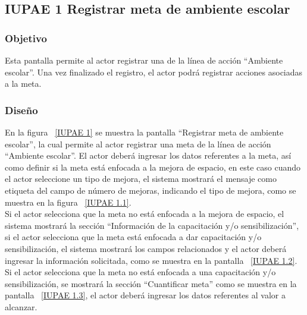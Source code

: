 \subsection{IUPAE 1 Registrar meta de ambiente escolar}
                     
\subsubsection{Objetivo}

   Esta pantalla permite al actor registrar una  de la línea de acción ``Ambiente escolar''. Una vez finalizado el registro, el actor podrá registrar acciones asociadas a la meta.

	
\subsubsection{Diseño}

  En la figura ~\ref{IUPAE 1} se muestra la pantalla ``Registrar meta de ambiente escolar'',
  la cual permite al actor registrar una meta de la línea de acción ``Ambiente escolar''. 
  El actor deberá ingresar los datos referentes a la meta, así como definir si la meta está enfocada a la mejora de espacio, en este caso 
  cuando el actor seleccione un tipo de mejora, el sistema mostrará el mensaje  como etiqueta del campo de número de mejoras, indicando el tipo de mejora,
  como se muestra en la figura ~\ref{IUPAE 1.1}.\\
  
  Si el actor selecciona que la meta no está enfocada a la mejora de espacio, el sistema mostrará la sección ``Información de la capacitación y/o sensibilización'',
  si el actor selecciona que la meta está enfocada a dar capacitación y/o sensibilización, el sistema mostrará los campos relacionados y
  el actor deberá ingresar la información solicitada, como se muestra en la pantalla ~\ref{IUPAE 1.2}.\\
  
  Si el actor selecciona que la meta no está enfocada a una capacitación y/o sensibilización, se mostrará la sección ``Cuantificar meta'' como se muestra en la pantalla ~\ref{IUPAE 1.3}, el actor 
  deberá ingresar los datos referentes al valor a alcanzar.\\
 
  
